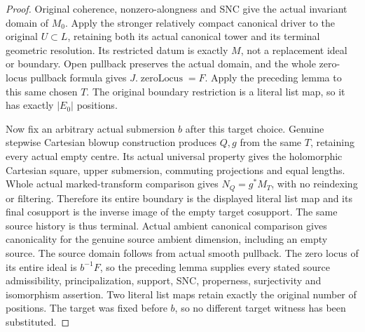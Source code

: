 \begin{proof}
Original coherence, nonzero-alongness and SNC give the actual invariant
domain of $M_0$. Apply the stronger relatively compact canonical driver
to the original $U\subset L$, retaining both its actual canonical tower
and its terminal geometric resolution. Its restricted datum is exactly
$M$, not a replacement ideal or boundary. Open pullback preserves the
actual domain, and the whole zero-locus pullback formula gives
$J.\operatorname{zeroLocus}=F$. Apply the preceding lemma to this same
chosen $T$. The original boundary restriction is a literal list map,
so it has exactly $|E_0|$ positions.

Now fix an arbitrary actual submersion $b$ after this target choice.
Genuine stepwise Cartesian blowup construction produces $Q,g$ from the
same $T$, retaining every actual empty centre. Its actual universal
property gives the holomorphic Cartesian square, upper submersion,
commuting projections and equal lengths. Whole actual marked-transform
comparison gives $N_Q=g^*M_T$, with no reindexing or filtering. Therefore
its entire boundary is the displayed literal list map and its final
cosupport is the inverse image of the empty target cosupport. The same
source history is thus terminal. Actual ambient canonical comparison
gives canonicality for the genuine source ambient dimension, including
an empty source. The source domain follows from actual smooth pullback.
The zero locus of its entire ideal is $b^{-1}F$, so the preceding lemma
supplies every stated source admissibility, principalization, support,
SNC, properness, surjectivity and isomorphism assertion. Two literal
list maps retain exactly the original number of positions. The target
was fixed before $b$, so no different target witness has been substituted.
\end{proof}

